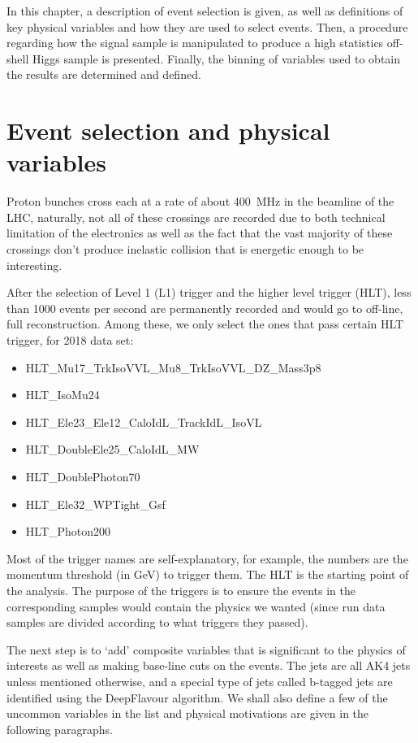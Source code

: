 In this chapter, a description of event selection is given, as well as definitions of
key physical variables and how they are used to select events. Then, a procedure regarding
how the signal sample is manipulated to produce a high statistics off-shell Higgs sample is presented.
Finally, the binning of variables used to obtain the results are determined and defined.

\section{Event selection and physical variables}
Proton bunches cross each at a rate of about \SI{400}{\mega\hertz} in the beamline of
the LHC, naturally, not all of these crossings are recorded due to both technical
limitation of the electronics as well as the fact that the vast majority of these
crossings don't produce inelastic collision that is energetic enough to be interesting.

After the selection of Level 1 (L1) trigger and the higher level trigger (HLT), less than 1000
events per second are permanently recorded and would go to off-line, full reconstruction. Among these,
we only select the ones that pass certain HLT trigger, for 2018 data set:
\begin{itemize}
    \item HLT\_Mu17\_TrkIsoVVL\_Mu8\_TrkIsoVVL\_DZ\_Mass3p8
    \item HLT\_IsoMu24
    \item HLT\_Ele23\_Ele12\_CaloIdL\_TrackIdL\_IsoVL
    \item HLT\_DoubleEle25\_CaloIdL\_MW
    \item HLT\_DoublePhoton70
    \item HLT\_Ele32\_WPTight\_Gsf
    \item HLT\_Photon200
\end{itemize}
Most of the trigger names are self-explanatory, for example, the numbers are the momentum 
threshold (in \si{\giga\electronvolt}) to trigger them. The HLT is the starting point of the analysis. The
purpose of the triggers is to ensure the events in the corresponding samples would contain the physics
we wanted (since run data samples are divided according to what triggers they passed).

The next step is to `add' composite variables that is significant to the physics of interests as
well as making base-line cuts on the events.
The jets are all AK4 jets unless mentioned otherwise, and a special type of jets called b-tagged
jets are  identified using the DeepFlavour algorithm.\cite{deepflavour}  
We shall also define a few of the
uncommon variables in the list and physical motivations are given in the following
paragraphs.

